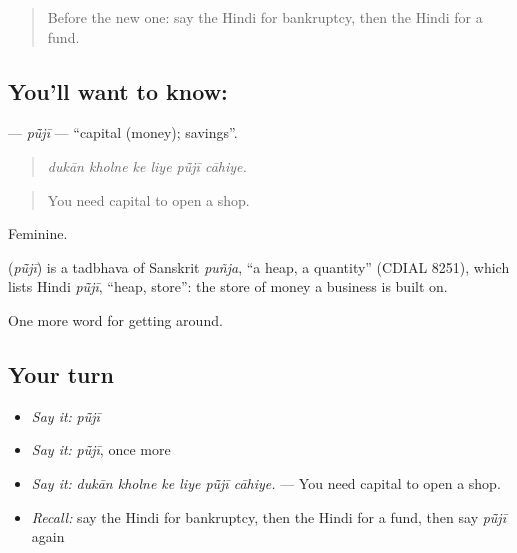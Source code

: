 \label{lesson:HI-C430-puji}



\begin{quote}
Before the new one: say the Hindi for bankruptcy, then the Hindi for a fund.
\end{quote}

\subsection*{You'll want to know: }
\textbf{} — \emph{pū̃jī} — \textquotedblleft{}capital (money); savings\textquotedblright{}.

\begin{quote}
     
\end{quote}

\begin{quote}
\emph{dukān kholne ke liye pū̃jī cāhiye.}
\end{quote}

\begin{quote}
You need capital to open a shop.
\end{quote}

Feminine.

\begin{cousinweb}
\textbf{} (\emph{pū̃jī}) is a tadbhava of Sanskrit \emph{puñja}, \textquotedblleft{}a heap, a quantity\textquotedblright{} (CDIAL 8251), which lists Hindi \emph{pū̃jī}, \textquotedblleft{}heap, store\textquotedblright{}: the store of money a business is built on.
\end{cousinweb}

\begin{grammarlens}[title={What you've built}]
One more word for getting around.
\end{grammarlens}

\subsection*{Your turn}
\begin{itemize}
\raggedright
  \item \emph{Say it:} \emph{pū̃jī}
  \item \emph{Say it:} \emph{pū̃jī}, once more
  \item \emph{Say it:} \emph{dukān kholne ke liye pū̃jī cāhiye.} — You need capital to open a shop.
  \item \emph{Recall:} say the Hindi for bankruptcy, then the Hindi for a fund, then say \emph{pū̃jī} again
\end{itemize}

